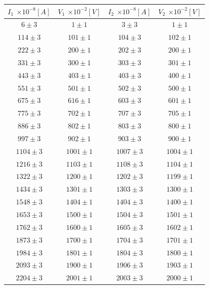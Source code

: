 \documentclass[a4paper]{article}
\begin{document}
\begin{center}
\begin{tabular}{|c|c|c|c|}
\hline
$I_1$ $\times 10^{-8}[A]$ & $V_1$ $\times 10^{-2}[V]$ & $I_2$ $\times 10^{-8}[A]$ & $V_2$ $\times 10^{-2}[V]$ \\
\hline
$6 \pm 3$ & $1 \pm 1$ & $3 \pm 3$ & $1 \pm 1$ \\
$114 \pm 3$ & $101 \pm 1$ & $104 \pm 3$ & $102 \pm 1$ \\
$222 \pm 3$ & $200 \pm 1$ & $202 \pm 3$ & $200 \pm 1$ \\
$331 \pm 3$ & $300 \pm 1$ & $303 \pm 3$ & $301 \pm 1$ \\
$443 \pm 3$ & $403 \pm 1$ & $403 \pm 3$ & $400 \pm 1$ \\
$551 \pm 3$ & $501 \pm 1$ & $502 \pm 3$ & $500 \pm 1$ \\
$675 \pm 3$ & $616 \pm 1$ & $603 \pm 3$ & $601 \pm 1$ \\
$775 \pm 3$ & $702 \pm 1$ & $707 \pm 3$ & $705 \pm 1$ \\
$886 \pm 3$ & $802 \pm 1$ & $803 \pm 3$ & $800 \pm 1$ \\
$997 \pm 3$ & $902 \pm 1$ & $903 \pm 3$ & $900 \pm 1$ \\
$1104 \pm 3$ & $1001 \pm 1$ & $1007 \pm 3$ & $1004 \pm 1$ \\
$1216 \pm 3$ & $1103 \pm 1$ & $1108 \pm 3$ & $1104 \pm 1$ \\
$1322 \pm 3$ & $1200 \pm 1$ & $1202 \pm 3$ & $1199 \pm 1$ \\
$1434 \pm 3$ & $1301 \pm 1$ & $1303 \pm 3$ & $1300 \pm 1$ \\
$1548 \pm 3$ & $1404 \pm 1$ & $1404 \pm 3$ & $1400 \pm 1$ \\
$1653 \pm 3$ & $1500 \pm 1$ & $1504 \pm 3$ & $1501 \pm 1$ \\
$1762 \pm 3$ & $1600 \pm 1$ & $1605 \pm 3$ & $1602 \pm 1$ \\
$1873 \pm 3$ & $1700 \pm 1$ & $1704 \pm 3$ & $1701 \pm 1$ \\
$1984 \pm 3$ & $1801 \pm 1$ & $1804 \pm 3$ & $1800 \pm 1$ \\
$2093 \pm 3$ & $1900 \pm 1$ & $1906 \pm 3$ & $1903 \pm 1$ \\
$2204 \pm 3$ & $2001 \pm 1$ & $2003 \pm 3$ & $2000 \pm 1$ \\
\hline
\end{tabular}
\vspace{0.3cm}
\begin{tabular}{|c|c|c|c|}
\hline

\end{tabular}
\end{center}
\end{document}
